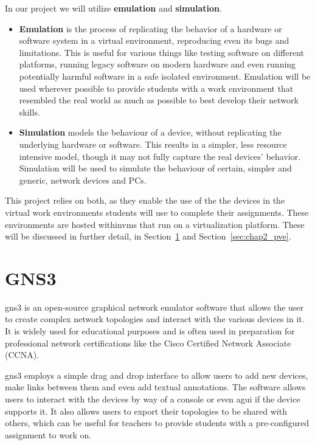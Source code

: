   In our project we will utilize \textbf{emulation} and \textbf{simulation}. 

  \begin{itemize}
    \item \textbf{Emulation} is the process of replicating the behavior of a hardware or software system in a virtual environment, 
    reproducing even its bugs and limitations. This is useful for various things like testing software on different platforms, 
    running legacy software on modern hardware and even running potentially harmful software in a safe isolated environment.
    Emulation will be used wherever possible to provide students with a work environment that resembled the real world as much as 
    possible to best develop their network skills.
    \item \textbf{Simulation} models the behaviour of a device, without replicating the underlying hardware or software.
    This results in a simpler, less resource intensive model, though it may not fully capture the real devices' behavior.
    Simulation will be used to simulate the behaviour of certain, simpler and generic, network devices and PCs.
  \end{itemize}

  This project relies on both, as they enable the use of the the devices in the virtual work environments students will use to 
  complete their assignments. These environments are hosted within\ac{vm}s that run on a virtualization platform. These will be 
  discussed in further detail, in Section~\ref{sec:chap2_gns3} and Section~\ref{sec:chap2_pve}.


\section{GNS3}
\label{sec:chap2_gns3}
  \ac{gns3} is an open-source graphical network emulator software that allows the user to create complex network topologies 
  and interact with the various devices in it. It is widely used for educational purposes and is often used in preparation 
  for professional network certifications like the Cisco Certified Network Associate (CCNA).

  \ac{gns3} employs a simple drag and drop interface to allow users to add new devices, make links between them 
  and even add textual annotations. The software allows users to interact with the devices by way of a console or even a\ac{gui}
  if the device supports it. It also allows users to export their topologies to be shared with others, which can
  be useful for teachers to provide students with a pre-configured assignment to work on.

